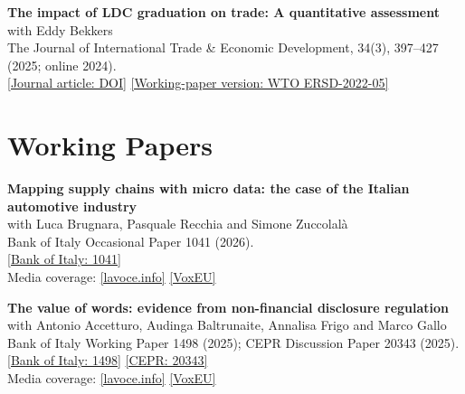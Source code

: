 \documentclass[11pt,a4paper]{article}
\begin{document}
\noindent\begin{minipage}{\linewidth}
\textbf{The impact of LDC graduation on trade: A quantitative assessment}\\
with Eddy Bekkers\\
The Journal of International Trade \& Economic Development, 34(3), 397--427 (2025; online 2024).\\
\href{https://doi.org/10.1080/09638199.2024.2323661}{[Journal article: DOI]} \href{https://www.wto.org/english/res_e/reser_e/ersd202205_e.htm}{[Working-paper version: WTO ERSD-2022-05]}
\end{minipage}\par\medskip

\section*{Working Papers}
\noindent\begin{minipage}{\linewidth}
\textbf{Mapping supply chains with micro data: the case of the Italian automotive industry}\\
with Luca Brugnara, Pasquale Recchia and Simone Zuccolalà\\
Bank of Italy Occasional Paper 1041 (2026).\\
\href{https://www.bancaditalia.it/pubblicazioni/qef/2026-1041/index.html?com.dotmarketing.htmlpage.language=1}{[Bank of Italy: 1041]}
\\ Media coverage: \href{https://lavoce.info/archives/112861/la-filiera-dellauto-vista-da-dentro/}{[lavoce.info]} \href{https://cepr.org/voxeu/columns/inside-automotive-supply-chain-empirical-evidence-italian-business-business-trade}{[VoxEU]}
\end{minipage}\par\medskip
\noindent\begin{minipage}{\linewidth}
\textbf{The value of words: evidence from non-financial disclosure regulation}\\
with Antonio Accetturo, Audinga Baltrunaite, Annalisa Frigo and Marco Gallo\\
Bank of Italy Working Paper 1498 (2025); CEPR Discussion Paper 20343 (2025).\\
\href{https://www.bancaditalia.it/pubblicazioni/temi-discussione/2025/2025-1498/index.html?com.dotmarketing.htmlpage.language=1}{[Bank of Italy: 1498]} \href{https://cepr.org/publications/dp20343}{[CEPR: 20343]}
\\ Media coverage: \href{https://lavoce.info/archives/108464/il-valore-delle-parole-quanto-contano-le-dichiarazioni-non-finanziarie/}{[lavoce.info]} \href{https://cepr.org/voxeu/columns/value-words-evidence-non-financial-disclosure-regulation}{[VoxEU]}
\end{minipage}\par\medskip
\end{document}
